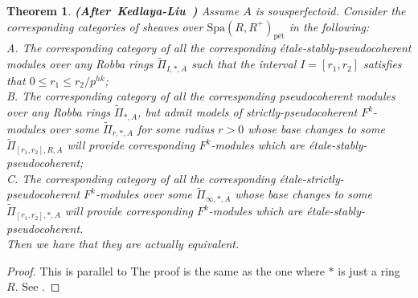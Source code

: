 \documentclass[12pt]{amsart}
\newtheorem{theorem}{Theorem}[section]
\theoremstyle{definition}
\numberwithin{equation}{section}
\begin{document}
\begin{theorem}\mbox{\bf{(After Kedlaya-Liu \cite[Theorem 4.6.1]{KL2})}}
Assume $A$ is sousperfectoid. Consider the corresponding categories of sheaves over $\mathrm{Spa}(R,R^+)_{\text{p\'et}}$ in the following:\\
A. The corresponding category of all the corresponding \'etale-stably-pseudocoherent modules over any Robba rings $\widetilde{\Pi}_{I,*,A}$ such that the interval $I=[r_1,r_2]$ satisfies that $0\leq r_1 \leq r_2/p^{hk}$;\\
B. The corresponding category of all the corresponding pseudocoherent modules over any Robba rings $\widetilde{\Pi}_{*,A}$, but admit models of strictly-pseudocoherent $F^k$-modules over some $\widetilde{\Pi}_{r,*,A}$ for some radius $r>0$ whose base changes to some $\widetilde{\Pi}_{[r_1,r_2],R,A}$ will provide corresponding $F^k$-modules which are \'etale-stably-pseudocoherent;\\
C. The corresponding category of all the corresponding \'etale-strictly-pseudocoherent $F^k$-modules over some $\widetilde{\Pi}_{\infty,*,A}$ whose base changes to some $\widetilde{\Pi}_{[r_1,r_2],*,A}$ will provide corresponding $F^k$-modules which are \'etale-stably-pseudocoherent.\\
Then we have that they are actually equivalent.


\end{theorem}



\begin{proof}
This is parallel to \cite[Theorem 4.6.1]{KL2}The proof is the same as the one where $*$ is just a ring $R$. See \cite[Theorem 4.11]{XT2}.	
\end{proof}
\end{document}
